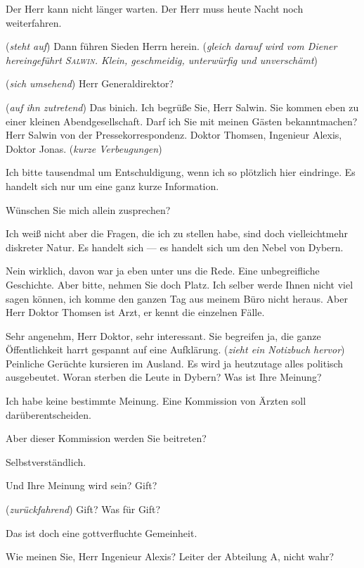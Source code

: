 \documentclass[
	final,
	a4paper,
	ngerman,
	mpinclude = true, %
	twoside = true,
	open = right,
	cleardoublepage = plain,
	DIV = 13,
	BCOR = 1cm,
	titlepage = firstiscover,
	]{scrbook}
\newcommand{\direction}[1]{(\textit{#1})}
\newcommand{\thecharacter}[1]{\textup{\textsc{#1}}\xspace}
\newcommand{\theAlexis}{\thecharacter{Alexis}}
\newcommand{\theThomsen}{\thecharacter{Thomsen}}
\newcommand{\theSalwin}{\thecharacter{Salwin}}
\newcommand{\theDiener}{\thecharacter{Diener}}
\newcommand{\character}[1]{\item[#1]}
\newcommand{\Generaldirektor}{\character{Direktor}}
\newcommand{\Alexis}{\character{\theAlexis}}
\newcommand{\Thomsen}{\character{\theThomsen}}
\newcommand{\Salwin}{\character{\theSalwin}}
\newcommand{\Diener}{\character{\theDiener}}
\begin{document}
\begin{play}
\Diener
Der Herr kann nicht länger warten. Der Herr muss heute Nacht noch weiterfahren.

\Generaldirektor
\direction{steht auf} Dann führen Sieden Herrn herein. \direction{gleich darauf wird vom Diener hereingeführt \theSalwin. Klein, geschmeidig, unterwürfig und unverschämt}

\Salwin
\direction{sich umsehend} Herr Generaldirektor?

\Generaldirektor
\direction{auf ihn zutretend} Das binich. Ich begrüße Sie, Herr Salwin. Sie kommen eben zu einer kleinen Abendgesellschaft. Darf ich Sie mit meinen Gästen bekanntmachen? Herr Salwin von der Pressekorrespondenz. Doktor Thomsen, Ingenieur Alexis, Doktor Jonas. \direction{kurze Verbeugungen}

\Salwin
Ich bitte tausendmal um Entschuldigung, wenn ich so plötzlich hier eindringe. Es handelt sich nur um eine ganz kurze Information.

\Generaldirektor
Wünschen Sie mich allein zusprechen?

\Salwin
Ich weiß nicht aber die Fragen, die ich zu stellen habe, sind doch vielleichtmehr diskreter Natur. Es handelt sich --- es handelt sich um den Nebel von Dybern.

\Generaldirektor
Nein wirklich, davon war ja eben unter uns die Rede. Eine unbegreifliche Geschichte. Aber bitte, nehmen Sie doch Platz. Ich selber werde Ihnen nicht viel sagen können, ich komme den ganzen Tag aus meinem Büro nicht heraus. Aber Herr Doktor Thomsen ist Arzt, er kennt die einzelnen Fälle.

\Salwin
Sehr angenehm, Herr Doktor, sehr interessant. Sie begreifen ja, die ganze Öffentlichkeit harrt gespannt auf eine Aufklärung. \direction{zieht ein Notizbuch hervor} Peinliche Gerüchte kursieren im Ausland. Es wird ja heutzutage alles politisch ausgebeutet. Woran sterben die Leute in Dybern? Was ist Ihre Meinung?

\Thomsen
Ich habe keine bestimmte Meinung. Eine Kommission von Ärzten soll darüberentscheiden.

\Salwin
Aber dieser Kommission werden Sie beitreten?

\Thomsen
Selbstverständlich.

\Salwin
Und Ihre Meinung wird sein? Gift?

\Thomsen
\direction{zurückfahrend} Gift? Was für Gift?

\Alexis
Das ist doch eine gottverfluchte Gemeinheit.

\Salwin
Wie meinen Sie, Herr Ingenieur Alexis? Leiter der Abteilung A, nicht wahr?


\end{play}
\end{document}
